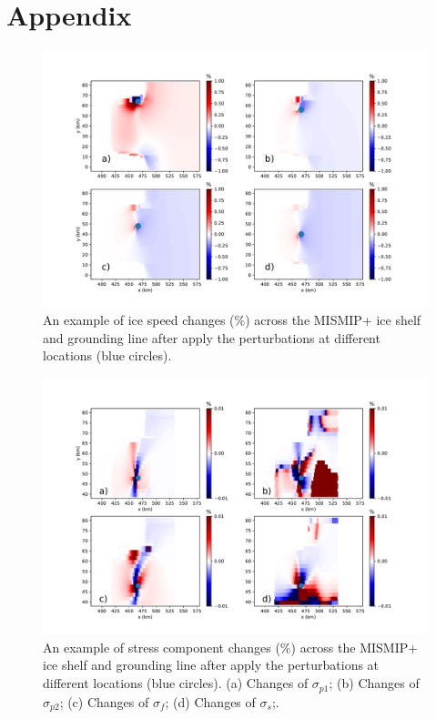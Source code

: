 \documentclass[review,oneside]{igs}
\begin{document}
\section{Appendix}

\renewcommand{\thefigure}{A\arabic{figure}}
\setcounter{figure}{0}

\begin{figure}
	\centering
	\includegraphics[width=1\linewidth]{figs/distPerturbComp.pdf}
	\caption{An example of ice speed changes (\%) across the MISMIP+ ice shelf and grounding line after apply the perturbations at different locations (blue circles).}
	\label{distPerturbComp}
\end{figure}

\begin{figure}
	\centering
	\includegraphics[width=1\linewidth]{figs/stressDiff.pdf}
	\caption{An example of stress component changes (\%) across the MISMIP+ ice shelf and grounding line after apply the perturbations at different locations (blue circles). (a) Changes of $\sigma_{p1}$; (b) Changes of $\sigma_{p2}$; (c) Changes of $\sigma_{f}$; (d) Changes of $\sigma_{s}$;.}
	\label{stressDiff}
\end{figure}
\end{document}
